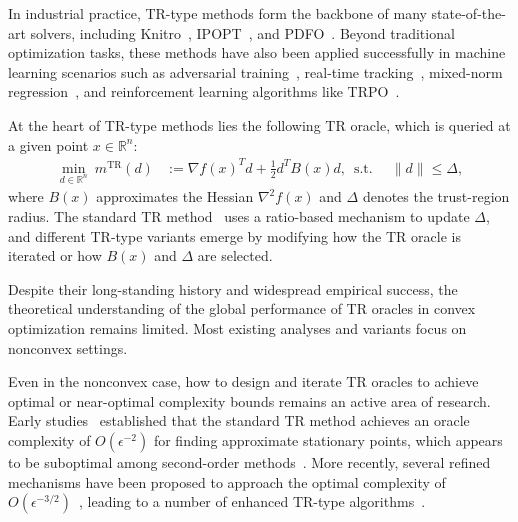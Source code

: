 \documentclass{article}
\begin{document}
In industrial practice, TR-type methods form the backbone of many state-of-the-art solvers, including Knitro~\cite{byrd2006k}, IPOPT~\cite{wachter2006implementation}, and PDFO~\cite{ragonneau2024pdfo}. Beyond traditional optimization tasks, these methods have also been applied successfully in machine learning scenarios such as adversarial training~\cite{yao2019trust}, real-time tracking~\cite{liu2004real}, mixed-norm regression~\cite{kim2010scalable}, and reinforcement learning algorithms like TRPO~\cite{schulman2015trust,kurutach2018model}.

At the heart of TR-type methods lies the following TR oracle, which is queried at a given point $x \in \mathbb{R}^n$:
\begin{equation}
\label{eq.classic tr subproblem} \begin{aligned} \min_{d \in \mathbb{R}^n} \ m^{\text{TR}}(d)&:= \nabla f(x)^T d+\tfrac{1}{2}d^T B
(x)d, \ \operatorname{s.t.} \ &\|d\|\le \Delta,
\end{aligned}
\end{equation}
where $B(x)$ approximates the Hessian $\nabla^2 f(x)$ and $\Delta$ denotes the trust-region radius. The standard TR method~\cite{conn2000trust} uses a ratio-based mechanism to update $\Delta$, and different TR-type variants emerge by modifying how the TR oracle is iterated or how $B(x)$ and $\Delta$ are selected.

Despite their long-standing history and widespread empirical success, the theoretical understanding of the global performance of TR oracles in convex optimization remains limited. Most existing analyses and variants focus on nonconvex settings.

Even in the nonconvex case, how to design and iterate TR oracles to achieve optimal or near-optimal complexity bounds remains an active area of research. Early studies~\cite{conn2000trust,nocedal1999numerical,cartisComplexitySteepestDescent2010,cartisComplexityBoundsSecondorder2012} established that the standard TR method achieves an oracle complexity of $O(\epsilon^{-2})$ for finding approximate stationary points, which appears to be suboptimal among second-order methods~\cite{carmon2021lower}. More recently, several refined mechanisms have been proposed to approach the optimal complexity of $O(\epsilon^{-3/2})$~\cite{carmon2021lower}, leading to a number of enhanced TR-type algorithms~\cite{luenberger_linear_2021, curtis2017trust, curtis2021trust, hamad2022consistently, hamad2024simplepracticaladaptivetrustregion}.
\end{document}
